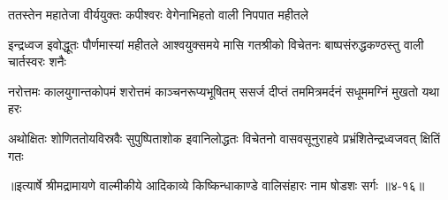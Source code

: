 \twolineshloka
{ततस्तेन महातेजा वीर्ययुक्तः कपीश्वरः}
{वेगेनाभिहतो वाली निपपात महीतले} %

\threelineshloka
{इन्द्रध्वज इवोद्धूतः पौर्णमास्यां महीतले}
{आश्वयुक्समये मासि गतश्रीको विचेतनः}
{बाष्पसंरुद्धकण्ठस्तु वाली चार्तस्वरः शनैः} %

\twolineshloka
{नरोत्तमः कालयुगान्तकोपमं शरोत्तमं काञ्चनरूप्यभूषितम्}
{ससर्ज दीप्तं तममित्रमर्दनं सधूममग्निं मुखतो यथा हरः} %

\twolineshloka
{अथोक्षितः शोणिततोयविस्रवैः सुपुष्पिताशोक इवानिलोद्धतः}
{विचेतनो वासवसूनुराहवे प्रभ्रंशितेन्द्रध्वजवत् क्षितिं गतः} %


॥इत्यार्षे श्रीमद्रामायणे वाल्मीकीये आदिकाव्ये किष्किन्धाकाण्डे वालिसंहारः नाम षोडशः सर्गः ॥४-१६॥
